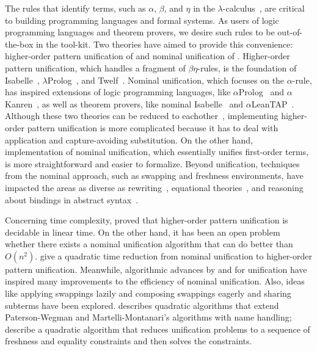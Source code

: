 \documentclass[a4paper,UKenglish]{lipics-v2016}
\begin{document}
The rules that identify terms, such as $\alpha$, $\beta$, and $\eta$
in the $\lambda$-calculus~\citep{church_calculi_1941}, are critical to
building programming languages and formal systems.  As users of logic
programming languages and theorem provers, we desire such rules to be
out-of-the-box in the tool-kit.  Two theories have aimed to provide
this convenience: higher-order pattern unification of
\citet{miller_logic_1989} and nominal unification of
\citet{urban_nominal_2004}.  Higher-order pattern unification, which
handles a fragment of $\beta\eta$-rules, is the foundation of
Isabelle~\citep{paulson_natural_1986},
$\lambda$Prolog~\citep{nadathur_overview_1988}, and
Twelf~\citep{pfenning_system_1999-1}.  Nominal unification, which
focuses on the $\alpha$-rule, has inspired extensions of logic
programming languages, like $\alpha$Prolog~\citep{cheney_prolog:_2004}
and $\alpha$Kanren~\citep{byrd_alphakanren:_2007}, as well as theorem
provers, like nominal Isabelle~\citep{urban_nominal_2005} and
$\alpha$LeanTAP~\citep{near_leantap:_2008}.  Although these two
theories can be reduced to eachother~\citep{cheney_relating_2005,
  levy_nominal_2012}, implementing higher-order pattern unification is
more complicated because it has to deal with application and
capture-avoiding substitution.  On the other hand, implementation of
nominal unification, which essentially unifies first-order terms, is
more straightforward and easier to formalize.  Beyond unification,
techniques from the nominal approach, such as swapping and freshness
environments, have impacted the areas as diverse as
rewriting~\citep{fernandez_nominal_2004, fernandez_nominal_2005,
  fernandez_nominal_2007, aoto_nominal_2016}, equational
theories~\citep{ayala-rincon_nominal_2016}, and reasoning about
bindings in abstract syntax~\citep{pitts_metalanguage_2000,
  gabbay_new_2002}.

Concerning time complexity, \citet{qian_unification_1996} proved that
higher-order pattern unification is decidable in linear time.  On the
other hand, it has been an open problem whether there exists a nominal
unification algorithm that can do better than
$O(n^2)$. \citet{levy_nominal_2012} give a quadratic time reduction
from nominal unification to higher-order pattern unification.
Meanwhile, algorithmic advances by \citet{paterson_linear_1978} and
\citet{martelli_efficient_1982} for unification have inspired many
improvements to the efficiency of nominal unification.  Also, ideas
like applying swappings lazily and composing swappings eagerly and
sharing subterms have been explored. \citet{calves_complexity_2010}
describes quadratic algorithms that extend Paterson-Wegman and
Martelli-Montanari's algorithms with name handling;
\citet{levy_efficient_2010} describe a quadratic algorithm that
reduces unification problems to a sequence of freshness and equality
constraints and then solves the constraints.
\end{document}
